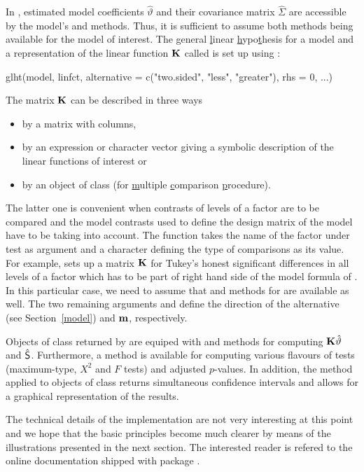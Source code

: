 \documentclass[12pt]{article}
\begin{document}
In \RR, estimated model coefficients $\hat{\vartheta}$ and their covariance 
matrix $\hat{\Sigma}$ are accessible by the model's  
and  methods. Thus, it is sufficient to assume both
methods being available for the model of interest. The \underline{g}eneral
\underline{l}inear \underline{h}ypo\underline{t}hesis for a model 
 and a representation of the linear function $\K$
called  is set up using :
\begin{Sinput}
glht(model, linfct, alternative = c("two.sided", "less", "greater"), 
     rhs = 0, ...)
\end{Sinput}
The matrix $\K$ can be described in three ways
\begin{itemize}
\item by a matrix with  columns,
\item by an expression or character vector giving a symbolic description 
      of the linear functions of interest or
\item by an object of class  
      (for \underline{m}ultiple \underline{c}omparison \underline{p}rocedure).
\end{itemize}
The latter one is convenient when contrasts of levels of a factor are
to be compared and the model contrasts used to define the design matrix
of the model have to be taking into account. The  function
takes the name of the factor under test as argument and a character 
defining the type of comparisons as its value. For example,
 sets up a matrix $\K$ for Tukey's honest
significant differences in all levels of a factor 
which has to be part of right hand side of the model formula
of . In this particular case, we need to assume
that  and  methods for 
 are available as well. The two remaining arguments
 and  define the direction
of the alternative (see Section~\ref{model}) and $\m$, respectively.

Objects of class  returned by  are equiped with
 and  methods for computing
$\K \hat{\vartheta}$ and $\hat{\S}$. Furthermore, a  method
is available for computing various flavours of tests (maximum-type, $X^2$ and $F$
tests) and adjusted $p$-values. 
In addition, the  method applied to objects of class 
 returns simultaneous confidence intervals and allows
for a graphical representation of the results.

The technical details of the implementation are not very interesting
at this point and we hope that the basic principles become much
clearer by means of the illustrations presented in the next section.
The interested reader is refered to the online documentation shipped
with package .







\end{document}
